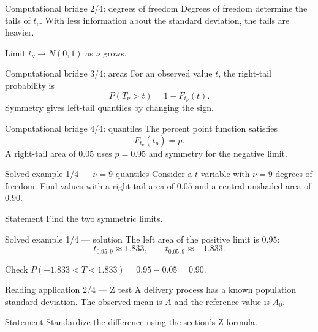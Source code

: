 \documentclass[10pt,aspectratio=169]{beamer}
\begin{document}
\begin{frame}{Computational bridge 2/4: degrees of freedom}
  \footnotesize
  Degrees of freedom determine the tails of $t_\nu$. With less information
  about the standard deviation, the tails are heavier.
  \begin{block}{Limit}
    $t_\nu\to N(0,1)$ as $\nu$ grows.
  \end{block}
\end{frame}

\begin{frame}{Computational bridge 3/4: areas}
  \footnotesize
  For an observed value $t$, the right-tail probability is
  \[
    P(T_\nu>t)=1-F_{t_\nu}(t).
  \]
  Symmetry gives left-tail quantiles by changing the sign.
\end{frame}

\begin{frame}{Computational bridge 4/4: quantiles}
  \footnotesize
  The percent point function satisfies
  \[
    F_{t_\nu}(t_p)=p.
  \]
  A right-tail area of $0.05$ uses $p=0.95$ and symmetry for the negative limit.
\end{frame}

\begin{frame}{Solved example 1/4 --- $\nu=9$ quantiles}
  \footnotesize
  Consider a $t$ variable with $\nu=9$ degrees of freedom. Find values with a
  right-tail area of $0.05$ and a central unshaded area of $0.90$.
  \begin{block}{Statement}
    Find the two symmetric limits.
  \end{block}
\end{frame}

\begin{frame}{Solved example 1/4 --- solution}
  \footnotesize
  The left area of the positive limit is $0.95$:
  \[
    t_{0.95,9}\approx1.833,
    \qquad t_{0.05,9}\approx-1.833.
  \]
  \begin{alertblock}{Check}
    $P(-1.833<T<1.833)=0.95-0.05=0.90$.
  \end{alertblock}
\end{frame}

\begin{frame}{Reading application 2/4 --- Z test}
  \footnotesize
  A delivery process has a known population standard deviation. The observed
  mean is $A$ and the reference value is $A_0$.
  \begin{block}{Statement}
    Standardize the difference using the section's Z formula.
  \end{block}
\end{frame}
\end{document}

